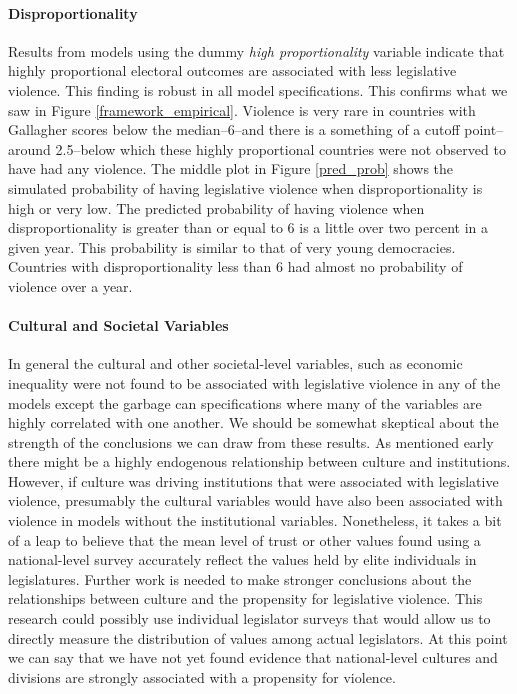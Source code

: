 \documentclass[a4paper]{article}\usepackage{graphicx, color}
\begin{document}
\paragraph{Disproportionality}
Results from models using the dummy {\emph{high proportionality}} variable indicate that highly proportional electoral outcomes are associated with less legislative violence. This finding is robust in all model specifications. This confirms what we saw in Figure \ref{framework_empirical}. Violence is very rare in countries with Gallagher scores below the median--6--and there is a something of a cutoff point--around 2.5--below which these highly proportional countries were not observed to have had any violence. The middle plot in Figure \ref{pred_prob} shows the simulated probability of having legislative violence when disproportionality is high or very low. The predicted probability of having violence when disproportionality is greater than or equal to 6 is a little over two percent in a given year. This probability is similar to that of very young democracies. Countries with disproportionality less than 6 had almost no probability of violence over a year.

\paragraph{Cultural and Societal Variables}

In general the cultural and other societal-level variables, such as economic inequality were not found to be associated with legislative violence in any of the models except the garbage can specifications where many of the variables are highly correlated with one another. We should be somewhat skeptical about the strength of the conclusions we can draw from these results. As mentioned early there might be a highly endogenous relationship between culture and institutions. However, if culture was driving institutions that were associated with legislative violence, presumably the cultural variables would have also been associated with violence in models without the institutional variables. Nonetheless, it takes a bit of a leap to believe that the mean level of trust or other values found using a national-level survey accurately reflect the values held by elite individuals in legislatures. Further work is needed to make stronger conclusions about the relationships between culture and the propensity for legislative violence. This research could possibly use individual legislator surveys that would allow us to directly measure the distribution of values among actual legislators. At this point we can say that we have not yet found evidence that national-level cultures and divisions are strongly associated with a propensity for violence.  
\end{document}
